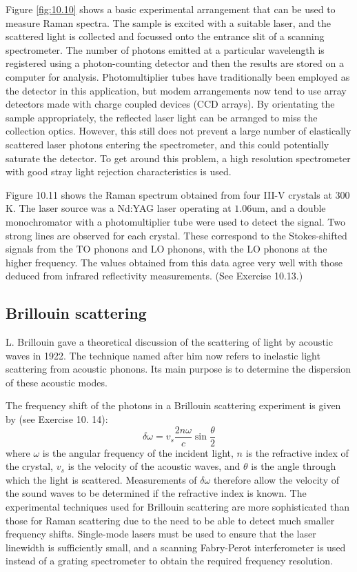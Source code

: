 \documentclass[12pt]{book}
\def\um{\mathrm{um}}
\begin{document}
Figure \ref{fig:10.10} shows a basic experimental arrangement that can be used to measure Raman spectra. The sample is excited with a suitable laser, and the scattered light is collected and focussed onto the entrance slit of a scanning spectrometer. The number of photons emitted at a particular wavelength is registered using a photon-counting detector and then the results are stored on a computer for analysis. Photomultiplier tubes have traditionally been employed as the detector in this application, but modem arrangements now tend to use array detectors made with charge coupled devices (CCD arrays). By orientating the sample appropriately, the reflected laser light can be arranged to miss the collection optics. However, this still does not prevent a large number of elastically scattered laser photons entering the spectrometer, and this could potentially saturate the detector. To get around this problem, a high resolution spectrometer with good stray light rejection characteristics is used.

Figure 10.11 shows the Raman spectrum obtained from four III-V crystals at 300 K. The laser source was a Nd:YAG laser operating at $1.06\um$, and a double monochromator with a photomultiplier tube were used to detect the signal. Two strong lines are observed for each crystal. These correspond to the Stokes-shifted signals from the TO phonons and LO phonons, with the LO phonons at the higher frequency. The values obtained from this data agree very well with those deduced from infrared reflectivity measurements. (See Exercise 10.13.)

\subsection{Brillouin scattering}
L. Brillouin gave a theoretical discussion of the scattering of light by acoustic waves in 1922. The technique named after him now refers to inelastic light scattering from acoustic phonons. Its main purpose is to determine the dispersion of these acoustic modes.

The frequency shift of the photons in a Brillouin scattering experiment is given by (see Exercise 10. 14):
\begin{equation}\label{equa:10.33}
  \delta\omega=v_s\frac{2n\omega}{c}\sin{\frac{\theta}{2}}
\end{equation}
where $\omega$ is the angular frequency of the incident light, $n$ is the refractive index of the crystal, $v_s$ is the velocity of the acoustic waves, and $\theta$ is the angle through which the light is scattered. Measurements of $\delta\omega$ therefore allow the velocity of the sound waves to be determined if the refractive index is known. The experimental techniques used for Brillouin scattering are more sophisticated than those for Raman scattering due to the need to be able to detect much smaller frequency shifts. Single-mode lasers must be used to ensure that the laser linewidth is sufficiently small, and a scanning Fabry-Perot interferometer is used instead of a grating spectrometer to obtain the required frequency resolution.
\end{document}
